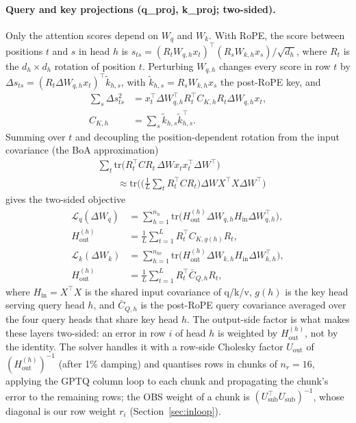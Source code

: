 \documentclass{article}
\newcommand{\tr}{\mathrm{tr}}
\newcommand{\Hin}{H_{\mathrm{in}}}
\newcommand{\Hout}{H_{\mathrm{out}}}
\begin{document}
\paragraph{Query and key projections (q\_proj, k\_proj; two-sided).}
Only the attention scores depend on $W_q$ and $W_k$. With RoPE, the score
between positions $t$ and $s$ in head $h$ is $s_{ts} = (R_t W_{q,h}
x_t)^\top (R_s W_{k,h} x_s)/\sqrt{d_h}$, where $R_t$ is the $d_h\times
d_h$ rotation of position $t$. Perturbing $W_{q,h}$ changes every score
in row $t$ by $\Delta s_{ts} = (R_t\Delta W_{q,h} x_t)^\top \tilde
k_{h,s}$, with $\tilde k_{h,s} = R_s W_{k,h} x_s$ the post-RoPE key, and
\begin{equation}
\begin{aligned}
  \sum_s \Delta s_{ts}^2 &= x_t^\top \Delta W_{q,h}^\top R_t^\top C_{K,h}
  R_t \Delta W_{q,h} x_t,\\
  C_{K,h} &= \sum_s \tilde k_{h,s}\tilde k_{h,s}^\top .
\end{aligned}
\label{eq:scores}
\end{equation}
Summing over $t$ and decoupling the position-dependent rotation from the
input covariance (the BoA approximation)
\begin{equation}
\begin{aligned}
  &\sum_t \tr\big(R_t^\top C R_t\,\Delta W x_t x_t^\top \Delta W^\top\big)\\
  &\qquad\approx \tr\Big(\big(\tfrac{1}{L}\textstyle\sum_t R_t^\top C R_t\big)
  \Delta W X^\top X \Delta W^\top\Big)
\end{aligned}
\label{eq:boaapprox}
\end{equation}
gives the two-sided objective
\begin{align}
  \mathcal{L}_q(\Delta W_q) &= \sum_{h=1}^{n_h}
  \tr\big(\Hout^{(h)}\Delta W_{q,h}\Hin\Delta W_{q,h}^\top\big),\nonumber\\
  \Hout^{(h)} &= \tfrac{1}{L}\textstyle\sum_{t=1}^{L} R_t^\top
  C_{K,g(h)} R_t, \label{eq:lq}\\
  \mathcal{L}_k(\Delta W_k) &= \sum_{h=1}^{n_{kv}}
  \tr\big(\Hout^{(h)}\Delta W_{k,h}\Hin\Delta W_{k,h}^\top\big),\nonumber\\
  \Hout^{(h)} &= \tfrac{1}{L}\textstyle\sum_{t=1}^{L} R_t^\top
  \bar C_{Q,h} R_t, \label{eq:lk}
\end{align}
where $\Hin = X^\top X$ is the shared input covariance of q/k/v, $g(h)$
is the key head serving query head $h$, and $\bar C_{Q,h}$ is the
post-RoPE query covariance averaged over the four query heads that share
key head $h$. The output-side factor is what makes these layers
two-sided: an error in row $i$ of head $h$ is weighted by $\Hout^{(h)}$,
not by the identity. The solver handles it with a row-side Cholesky
factor $U_{\mathrm{out}}$ of $(\Hout^{(h)})^{-1}$ (after 1\% damping) and
quantises rows in chunks of $n_r = 16$, applying the GPTQ column loop to
each chunk and propagating the chunk's error to the remaining rows; the
OBS weight of a chunk is $(U_{\mathrm{sub}}^\top U_{\mathrm{sub}})^{-1}$,
whose diagonal is our row weight $r_i$ (Section~\ref{sec:inloop}).
\end{document}
